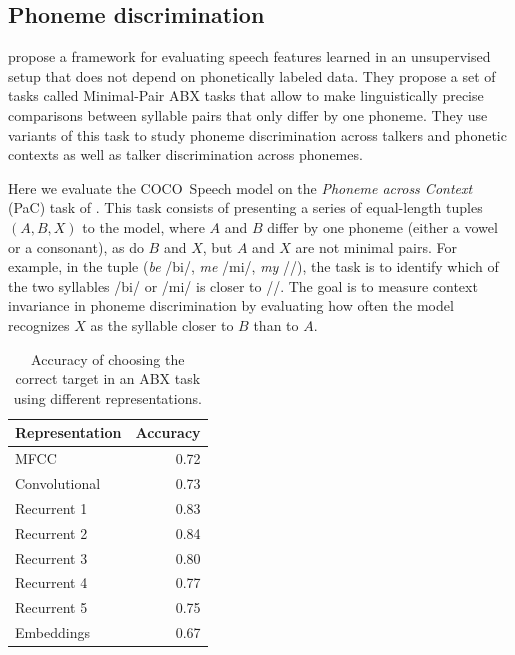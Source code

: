 \subsection{Phoneme discrimination}
\label{sec:abx}

\citet{schatz2013evaluating} propose a framework for evaluating speech features learned in an 
unsupervised setup that does not depend on phonetically labeled data. They propose a set of 
tasks called Minimal-Pair ABX tasks that allow to make linguistically precise comparisons 
between syllable pairs that only differ by one phoneme. They use variants of this task to study 
phoneme discrimination across talkers and phonetic contexts as well as talker discrimination 
across phonemes.

Here we evaluate the COCO~Speech model on the {\it Phoneme across Context} (PaC) task of 
\citet{schatz2013evaluating}. This task consists of presenting a series of equal-length tuples 
$(A, B, X)$ to the model, where $A$ and $B$ differ by one phoneme (either a vowel 
or a consonant), as do $B$ and $X$, but $A$ and $X$ are not minimal pairs.  For example, 
in the tuple ({\it be} /bi/, {\it me} /mi/, {\it my} //),
the task is to identify which of the two syllables /bi/ or /mi/ is closer to //.  The goal is to 
measure context invariance in phoneme discrimination by evaluating how often the model 
recognizes $X$ as the syllable closer to $B$ than to $A$.

\begin{table}[hb]
 \centering
 \caption{Accuracy of choosing the correct target in an ABX task using different 
 representations.}
 \label{tab:abx}
 \vspace{.2cm}
 \begin{tabular}{lr}
   \toprule
 { Representation} & {Accuracy} \\
 \midrule
 MFCC &  0.72 \\
 Convolutional & 0.73 \\
 Recurrent 1 &  0.83 \\
 Recurrent 2 &  0.84 \\
 Recurrent 3 &  0.80 \\
 Recurrent 4 &  0.77 \\
 Recurrent 5 &  0.75 \\
 Embeddings  &  0.67 \\
 \bottomrule
 \end{tabular}
 \end{table}


